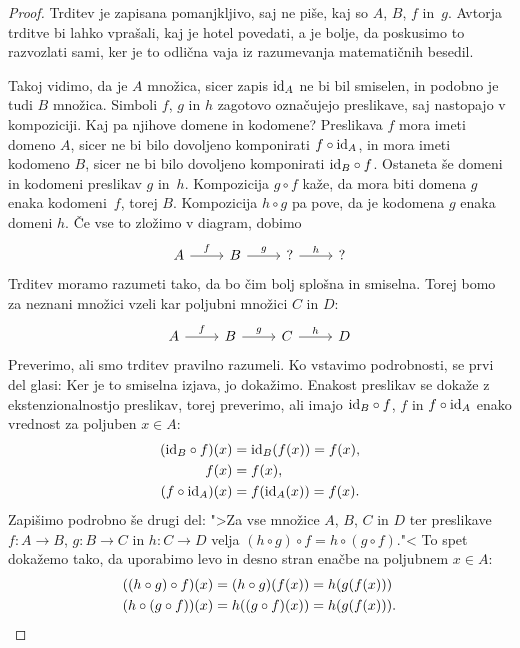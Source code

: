 \begin{proof}
  Trditev je zapisana pomanjkljivo, saj ne piše, kaj so $A$, $B$, $f$ in~$g$. Avtorja
  trditve bi lahko vprašali, kaj je hotel povedati, a je bolje, da poskusimo to razvozlati
  sami, ker je to odlična vaja iz razumevanja matematičnih besedil.

  Takoj vidimo, da je $A$ množica, sicer zapis $\id[A]$ ne bi bil smiselen, in podobno je
  tudi $B$ množica. Simboli $f$, $g$ in $h$ zagotovo označujejo preslikave, saj nastopajo
  v kompoziciji. Kaj pa njihove domene in kodomene? Preslikava $f$ mora imeti domeno $A$,
  sicer ne bi bilo dovoljeno komponirati $f \circ \id[A]$, in mora imeti kodomeno $B$,
  sicer ne bi bilo dovoljeno komponirati $\id[B] \circ f$. Ostaneta še domeni in kodomeni
  preslikav $g$ in~$h$. Kompozicija $g \circ f$ kaže, da mora biti domena $g$ enaka
  kodomeni~$f$, torej $B$. Kompozicija $h \circ g$ pa pove, da je kodomena $g$ enaka
  domeni $h$. Če vse to zložimo v diagram, dobimo
  \begin{equation*}
    \begin{tikzcd}
      A \arrow[r, "f"] & B \arrow[r, "g"] & {\text{?}} \arrow[r, "h"] & {\text{?}}
    \end{tikzcd}
  \end{equation*}
  Trditev moramo razumeti tako, da bo čim bolj splošna in smiselna. Torej bomo za neznani
  množici vzeli kar poljubni množici $C$ in $D$:
  \begin{equation*}
    \begin{tikzcd}
      A \arrow[r, "f"] & B \arrow[r, "g"] & C \arrow[r, "h"] & D
    \end{tikzcd}
  \end{equation*}
  Preverimo, ali smo trditev pravilno razumeli. Ko vstavimo podrobnosti, se prvi del
  glasi: 
  Ker je to smiselna izjava, jo dokažimo. Enakost preslikav se dokaže z ekstenzionalnostjo
  preslikav, torej preverimo, ali imajo $\id[B] \circ f$, $f$ in $f \circ \id[A]$ enako
  vrednost za poljuben $x \in A$:
  \begin{align*}
    (\id[B] \circ f)(x) &= \id[B] (f (x)) = f (x), \\
    f (x) &= f(x), \\
    (f \circ \id[A])(x) &= f (\id[A](x)) = f(x).
  \end{align*}
  Zapišimo podrobno še drugi del: ">Za vse množice $A$, $B$, $C$ in $D$ ter preslikave
  $f : A \to B$, $g : B \to C$ in $h : C \to D$ velja
  $(h \circ g) \circ f = h \circ (g \circ f)$."< To spet dokažemo tako, da uporabimo levo in
  desno stran enačbe na poljubnem $x \in A$:
  \begin{align*}
    ((h \circ g) \circ f)(x) &= (h \circ g)(f(x)) = h(g(f(x))) \\
    (h \circ (g \circ f))(x) &= h((g \circ f)(x)) = h(g(f(x))). \qedhere
  \end{align*}
\end{proof}




